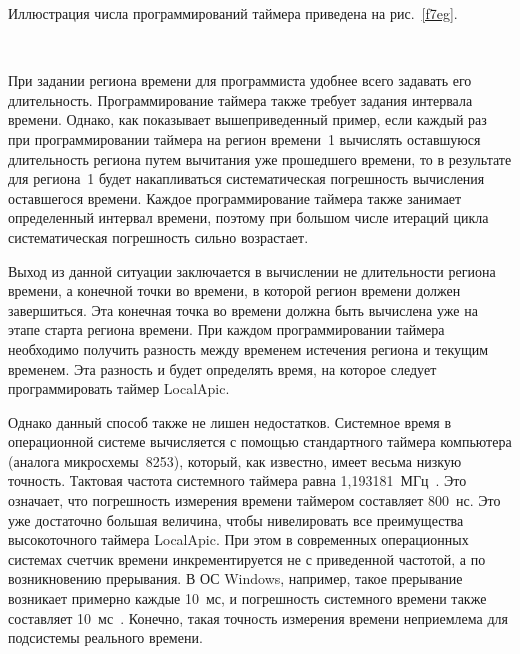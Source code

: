 \begin{multicols}{2}
   Иллюстрация числа программирований таймера приведена на рис.~\ref{f7eg}.

\begin{figure*} %
\vspace*{1pt}
\begin{center}
\mbox{%
\epsfxsize=151.583mm
}
\end{center}
\vspace*{-9pt}
   \vspace*{4pt}
   \end{figure*}

   При задании региона времени для программиста удобнее всего задавать его длительность.
Программирование таймера также требует задания \mbox{интервала} времени. Однако, как показывает
вышеприведенный пример, если каждый раз при программировании таймера на регион времени~1
вычислять оставшуюся длительность региона путем вычитания уже прошедшего времени, то в
результате для региона~1 будет накапливаться систематическая погрешность вычисления
оставшегося времени. Каждое программирование таймера также занимает определенный интервал
времени, поэтому при большом числе итераций цикла систематическая погрешность сильно
возрастает.

   Выход из данной ситуации заключается в вы\-чис\-ле\-нии не длительности региона времени, а
конечной точки во времени, в которой регион времени должен завершиться. Эта конечная точка
во времени должна быть вычислена уже на этапе старта региона времени. При каждом
программировании таймера необходимо получить разность между временем истечения региона и
текущим временем. Эта разность и будет определять время, на которое следует программировать
таймер LocalApic.

   Однако данный способ также не лишен недостатков. Системное время в операционной системе
вычисляется с помощью стандартного таймера компьютера (аналога микросхемы~8253), который,
как известно, имеет весьма низкую точность. Тактовая частота системного таймера равна
1,193181~МГц~\cite{5eg}. Это означает, что погрешность измерения времени таймером составляет
800~нс. Это уже достаточно большая величина, чтобы нивелировать все преимущества
высокоточного таймера LocalApic. При этом в современных операционных системах счетчик
времени инкрементируется не с приведенной частотой, а по возникновению прерывания. В ОС
Windows, например, такое прерывание возникает примерно каждые 10~мс, и погрешность
системного времени также составляет 10~мс~\cite{4eg}. Конечно, такая точность измерения
времени неприемлема для подсистемы реального времени.


\end{multicols}
